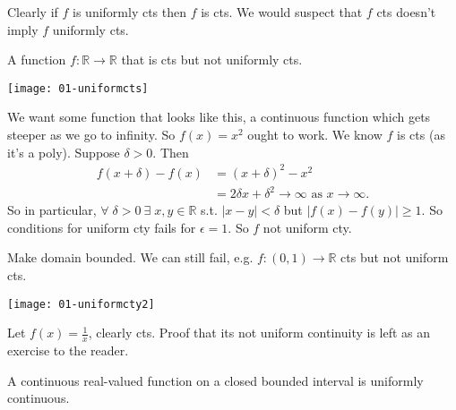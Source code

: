 \begin{remark}
    Clearly if $f$ is uniformly cts then $f$ is cts.
    We would suspect that $f$ cts doesn't imply $f$ uniformly cts.
\end{remark} 

\begin{example}
    A function $f: \mathbb{R} \to \mathbb{R}$ that is cts but not uniformly cts.

    {\par
\centering 
\texttt{[image: 01-uniformcts]} 
    \par}
    We want some function that looks like this, a continuous function which gets steeper as we go to infinity.
    So $f(x) = x^2$ ought to work.
    We know $f$ is cts (as it's a poly).
    Suppose $\delta > 0$.
    Then \begin{align*}
        f(x + \delta) - f(x) &= (x + \delta)^2 - x^2 \\
        &= 2 \delta x + \delta^2 \to \infty \text{ as } x \to \infty.
    \end{align*} 
    So in particular, $\forall \; \delta > 0 \ \exists \; x, y \in \mathbb{R}$ s.t. $|x-y| < \delta$ but $|f(x) - f(y)| \geq 1$.
    So conditions for uniform cty fails for $\epsilon = 1$.
    So $f$ not uniform cty.
\end{example} 

\begin{example} \label{exm:1/x}
    Make domain bounded.
    We can still fail, e.g. $f: (0, 1) \to \mathbb{R}$ cts but not uniform cts.

    { \par
    \centering 
    \texttt{[image: 01-uniformcty2]} 
    \par}

    Let $f(x) = \frac{1}{x}$, clearly cts.
    Proof that its not uniform continuity is left as an exercise to the reader.
\end{example} 

\begin{theorem} \label{thm:12}
    A continuous real-valued function on a closed bounded interval is uniformly continuous.
\end{theorem} 

